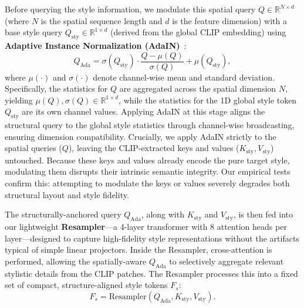 Before querying the style information, we modulate this spatial query $Q \in \mathbb{R}^{N \times d}$ (where $N$ is the spatial sequence length and $d$ is the feature dimension) with a base style query $Q_{\text{sty}} \in \mathbb{R}^{1 \times d}$ (derived from the global CLIP embedding) using \textbf{Adaptive Instance Normalization (AdaIN)}~\cite{huang2017arbitrary}:
\begin{equation}
    Q_{\text{Ada}} = \sigma(Q_{\text{sty}})\cdot \frac{Q - \mu(Q)}{\sigma(Q)} + \mu(Q_{\text{sty}}),
\end{equation}
where $\mu(\cdot)$ and $\sigma(\cdot)$ denote channel-wise mean and standard deviation. Specifically, the statistics for $Q$ are aggregated across the spatial dimension $N$, yielding $\mu(Q), \sigma(Q) \in \mathbb{R}^{1 \times d}$, while the statistics for the 1D global style token $Q_{\text{sty}}$ are its own channel values. Applying AdaIN at this stage aligns the structural query to the global style statistics through channel-wise broadcasting, ensuring dimension compatibility. Crucially, we apply AdaIN strictly to the spatial queries ($Q$), leaving the CLIP-extracted keys and values ($K_{\text{sty}}, V_{\text{sty}}$) untouched. Because these keys and values already encode the pure target style, modulating them disrupts their intrinsic semantic integrity. Our empirical tests confirm this: attempting to modulate the keys or values severely degrades both structural layout and style fidelity.

The structurally-anchored query $Q_{\text{Ada}}$, along with $K_{\text{sty}}$ and $V_{\text{sty}}$, is then fed into our lightweight \textbf{Resampler}—a 4-layer transformer with 8 attention heads per layer—designed to capture high-fidelity style representations without the artifacts typical of simple linear projectors. Inside the Resampler, cross-attention is performed, allowing the spatially-aware $Q_{\text{Ada}}$ to selectively aggregate relevant stylistic details from the CLIP patches. The Resampler processes this into a fixed set of compact, structure-aligned style tokens $F_s$:
\begin{equation}
    F_s = \text{Resampler}(Q_{\text{Ada}}, K_{\text{sty}}, V_{\text{sty}}).
\end{equation}

